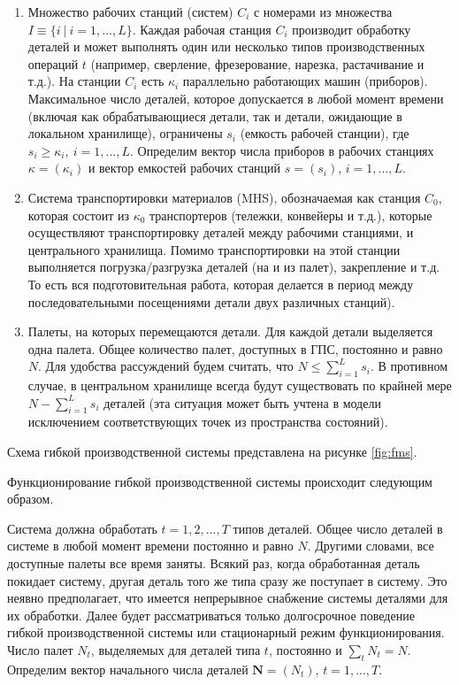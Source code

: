 \documentclass[a4paper,14pt]{extarticle}
\theoremstyle{note}
\begin{document}
\begin{enumerate}
\item Множество рабочих станций (систем) $C_i$ с номерами из множества $I \equiv \{ i ~|~ i=1,...,L \}$. Каждая рабочая станция $C_i$ производит обработку деталей и может выполнять один или несколько типов производственных операций $t$ (например, сверление, фрезерование, нарезка, растачивание и т.д.). На станции $C_i$ есть $\kappa_i$ параллельно работающих машин (приборов). Максимальное число деталей, которое допускается в любой момент времени (включая как обрабатывающиеся детали, так и детали, ожидающие в локальном хранилище), ограничены $s_i$ (емкость рабочей станции), где $s_i \geqslant \kappa_i, ~ i=1,...,L$. Определим вектор числа приборов в рабочих станциях $\kappa = (\kappa_i)$ и вектор емкостей рабочих станций $s = (s_i)$, $i=1,...,L$.

\item Система транспортировки материалов (MHS), обозначаемая как станция $C_0$, которая состоит из $\kappa_0$ транспортеров (тележки, конвейеры и т.д.), которые осуществляют транспортировку деталей между рабочими станциями, и центрального хранилища. Помимо транспортировки на этой станции выполняется погрузка/разгрузка деталей (на и из палет), закрепление и т.д. То есть вся подготовительная работа, которая делается в период между последовательными посещениями детали двух различных станций).

\item Палеты, на которых перемещаются детали. Для каждой детали выделяется одна палета. Общее количество палет, доступных в ГПС, постоянно и равно $N$. Для удобства рассуждений будем считать, что $N \leqslant \sum\limits_{i=1}^L s_i$. В противном случае, в центральном хранилище всегда будут существовать по крайней мере $N - \sum\limits_{i=1}^L s_i$ деталей (эта ситуация может быть учтена в модели исключением соответствующих точек из пространства состояний).
\end{enumerate}

Схема гибкой производственной системы представлена на рисунке \ref{fig:fms}.

Функционирование гибкой производственной системы происходит следующим образом.

Система должна обработать $t=1,2,...,T$ типов деталей. Общее число деталей в системе в любой момент времени постоянно и равно $N$. Другими словами, все доступные палеты все время заняты. Всякий раз, когда обработанная деталь покидает систему, другая деталь того же типа сразу же поступает в систему. Это неявно предполагает, что имеется непрерывное снабжение системы деталями для их обработки. Далее будет рассматриваться только долгосрочное поведение гибкой производственной системы или стационарный режим функционирования. Число палет $N_t$, выделяемых для деталей типа $t$, постоянно и $\sum\limits_t N_t = N$. Определим вектор начального числа деталей $\mathbf{N}=(N_t)$, $t=1,...,T$.
\end{document}

